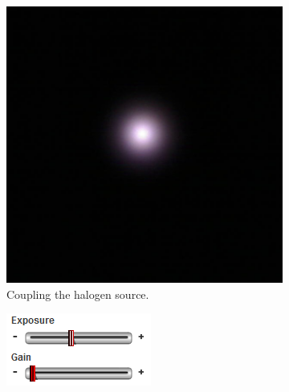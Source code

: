 \documentclass[a4paper, 12pt]{paper}
\begin{document}
\begin{figure}[H]
    \centering
    \begin{subfigure}[t]{0.3\textwidth}
        \includegraphics[width=\textwidth]{img/halogen_spot}
        \caption{Coupling the halogen source.}
    \end{subfigure}
    \begin{subfigure}[t]{0.3\textwidth}
        \includegraphics[width=\textwidth]{img/halogen}
    \end{subfigure}



\end{figure}
\end{document}
